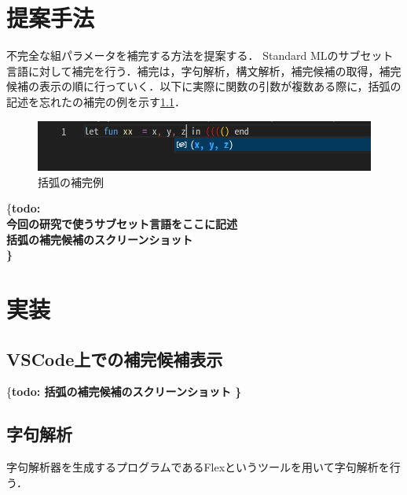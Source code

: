 \documentclass[12pt,a4j]{jreport}
\newcommand{\todo}[1]{{\{\bf todo: #1\}}}
\begin{document}
\chapter{提案手法}

不完全な組パラメータを補完する方法を提案する．
Standard MLのサブセット言語に対して補完を行う．補完は，字句解析，構文解析，補完候補の取得，補完候補の表示の順に行っていく．以下に実際に関数の引数が複数ある際に，括弧の記述を忘れたの補完の例を示す\ref{CodeCompletionDemo}．

\begin{figure}[H]
    \centering
    \includegraphics[width=15cm]{img/SampleComplete.png}
    \caption{括弧の補完例}
    \label{CodeCompletionDemo}
\end{figure}

\todo{
    \\
    今回の研究で使うサブセット言語をここに記述\\
    括弧の補完候補のスクリーンショット\\ 
}




\chapter{実装}

\section{VSCode上での補完候補表示}
\todo{
    括弧の補完候補のスクリーンショット
}



\section{字句解析}
字句解析器を生成するプログラムであるFlex\cite{flex}というツールを用いて字句解析を行う．





\end{document}
